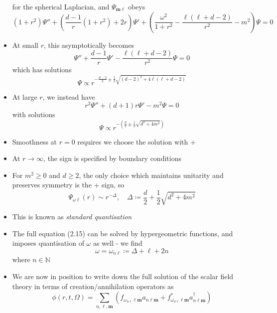 \documentclass[12pt,a4paper]{article}
\numberwithin{equation}{section}
\begin{document}
\begin{itemize}
		for the spherical Laplacian, and $\Psi_{\mathbf{m}\ell}$ obeys
		\begin{equation}
			(1+r^{2})\Psi''+\left(\frac{d-1}{r}(1+r^{2})+2r\right)\Psi'+\left(\frac{\omega^{2}}{1+r^{2}}-\frac{\ell(\ell+d-2)}{r^{2}}-m^{2}\right)\Psi=0
		\end{equation}
		\item At small $r$, this asymptotically becomes
		\begin{equation}
			\Psi''+\frac{d-1}{r}\Psi'-\frac{\ell(\ell+d-2)}{r^{2}}\Psi=0
		\end{equation}
		which has solutions
		\begin{equation}
			\Psi\propto r^{-\frac{d-2}{2}\pm\frac{1}{2}\sqrt{(d-2)^{2}+4\ell(\ell+d-2)}}
		\end{equation}
		\item At large $r$, we instead have
		\begin{equation}
			r^{2}\Psi''+(d+1)r\Psi'-m^{2}\Psi=0
		\end{equation}
		with solutions
		\begin{equation}
			\Psi\propto r^{-\left(\frac{d}{2}\pm\frac{1}{2}\sqrt{d^{2}+4m^{2}}\right)}
		\end{equation}
		\item Smoothness at $r=0$ requires we choose the solution with +
		\item At $r\to\infty$, the sign is specified by boundary conditions
		\item For $m^{2}\geq 0$ and $d\geq 2$, the only choice which maintains unitarity and preserves symmetry is the + sign, so
		\begin{equation}
			\Psi_{\omega\ell}(r)\sim r^{-\Delta},\quad\Delta\coloneqq\frac{d}{2}+\frac{1}{2}\sqrt{d^{2}+4m^{2}}
		\end{equation}
		\item This is known as \textit{standard quantisation}
		\item The full equation (2.15) can be solved by hypergeometric functions, and imposes quantisation of $\omega$ as well - we find
		\begin{equation}
			\omega=\omega_{n\ell}\coloneqq\Delta+\ell+2n
		\end{equation}
		where $n\in\mathbb{N}$
		\item We are now in position to write down the full solution of the scalar field theory in terms of creation/annihilation operators as
		\begin{equation}
			\phi(r,t,\Omega)=\sum_{n,\ell,\mathbf{m}}\left(f_{\omega_{n\ell}\ell\mathbf{m}}a_{n\ell\mathbf{m}}+f_{\omega_{n\ell}\ell\mathbf{m}}^{*}a^{\dagger}_{n\ell\mathbf{m}}\right)

\end{equation}
\end{itemize}
\end{document}
